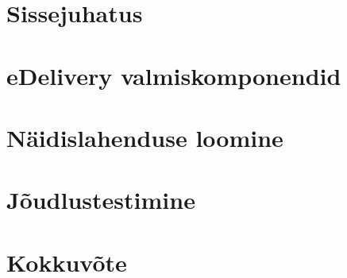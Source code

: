 

\chapter{Sissejuhatus}\label{chapter:introduction}\label{chapter:method} %

\chapter{eDelivery valmiskomponendid}\label{chapter:discussion}


\chapter{Näidislahenduse loomine}\label{chapter:result}\label{chapter:discussion}\label{chapter:method}


\chapter{Jõudlustestimine}\label{chapter:discussion}\label{chapter:method}


\chapter{Kokkuvõte}\label{chapter:summary}


